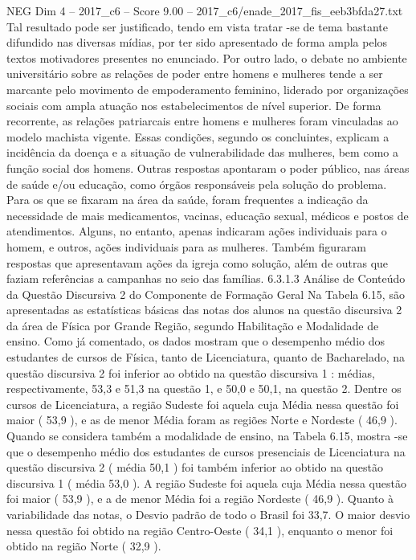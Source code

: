 \begin{textsample}{NEG Dim 4 – 2017\_c6 – Score 9.00 – 2017\_c6/enade\_2017\_fis\_eeb3bfda27.txt}
Tal resultado pode ser justificado, tendo em vista tratar -se de tema bastante difundido nas diversas mídias, por ter sido apresentado de forma ampla pelos textos motivadores presentes no enunciado.
Por outro lado, o debate no ambiente universitário sobre as relações de poder entre homens e mulheres tende a ser marcante pelo movimento de empoderamento feminino, liderado por organizações sociais com ampla atuação nos estabelecimentos de nível superior.
De forma recorrente, as relações patriarcais entre homens e mulheres foram vinculadas ao modelo machista vigente.
Essas condições, segundo os concluintes, explicam a incidência da doença e a situação de vulnerabilidade das mulheres, bem como a função social dos homens.
Outras respostas apontaram o poder público, nas áreas de saúde e/ou educação, como órgãos responsáveis pela solução do problema.
Para os que se fixaram na área da saúde, foram frequentes a indicação da necessidade de mais medicamentos, vacinas, educação sexual, médicos e postos de atendimentos.
Alguns, no entanto, apenas indicaram ações individuais para o homem, e outros, ações individuais para as mulheres.
Também figuraram respostas que apresentavam ações da igreja como solução, além de outras que faziam referências a campanhas no seio das famílias. 6.3.1.3 Análise de Conteúdo da Questão Discursiva 2 do Componente de Formação Geral Na Tabela 6.15, são apresentadas as estatísticas básicas das notas dos alunos na questão discursiva 2 da área de Física por Grande Região, segundo Habilitação e Modalidade de ensino.
Como já comentado, os dados mostram que o desempenho médio dos estudantes de cursos de Física, tanto de Licenciatura, quanto de Bacharelado, na questão discursiva 2 foi inferior ao obtido na questão discursiva 1 : médias, respectivamente, 53,3 e 51,3 na questão 1, e 50,0 e 50,1, na questão 2.
Dentre os cursos de Licenciatura, a região Sudeste foi aquela cuja Média nessa questão foi maior ( 53,9 ), e as de menor Média foram as regiões Norte e Nordeste ( 46,9 ).
Quando se considera também a modalidade de ensino, na Tabela 6.15, mostra -se que o desempenho médio dos estudantes de cursos presenciais de Licenciatura na questão discursiva 2 ( média 50,1 ) foi também inferior ao obtido na questão discursiva 1 ( média 53,0 ).
A região Sudeste foi aquela cuja Média nessa questão foi maior ( 53,9 ), e a de menor Média foi a região Nordeste ( 46,9 ).
Quanto à variabilidade das notas, o Desvio padrão de todo o Brasil foi 33,7.
O maior desvio nessa questão foi obtido na região Centro-Oeste ( 34,1 ), enquanto o menor foi obtido na região Norte ( 32,9 ).

\end{textsample}
